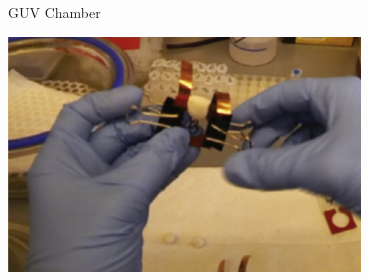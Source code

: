 \documentclass[presentation]{beamer}
\begin{document}
\begin{frame}[label=sec-14]{GUV Chamber}
\begin{center}
  \includegraphics[width=0.7\textwidth, interpolate=true]{figs/chamber}
\end{center}
\end{frame}
\end{document}
